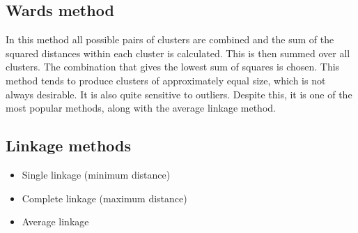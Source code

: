 \documentclass[a4paper,12pt]{article}
\begin{document}
\subsection{Wards method}
In this method all possible pairs of clusters are combined and the sum of the squared
distances within each cluster is calculated. This is then summed over all clusters. The
combination that gives the lowest sum of squares is chosen. This method tends to
produce clusters of approximately equal size, which is not always desirable. It is also
quite sensitive to outliers. Despite this, it is one of the most popular methods, along
with the average linkage method.

%
%
%
%
%



\subsection{Linkage methods}
\begin{itemize}
	\item  Single linkage (minimum distance)
	\item  Complete linkage (maximum distance)
	\item  Average linkage
\end{itemize}

\end{document}
